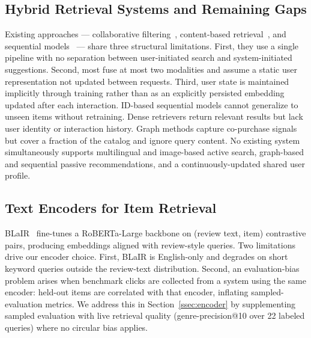 \subsection{Hybrid Retrieval Systems and Remaining Gaps}
Existing approaches — collaborative filtering~\cite{wang2019ngcf,he2020lightgcn,ying2018pinsage},
content-based retrieval~\cite{radford2021clip}, and sequential
models~\cite{kang2018self,xie2022difsr} — share three structural limitations.
First, they use a single pipeline with no separation between
user-initiated search and system-initiated suggestions.
Second, most fuse at most two modalities and assume a static user
representation not updated between requests.
Third, user state is maintained implicitly through training rather than
as an explicitly persisted embedding updated after each interaction.
ID-based sequential models cannot generalize to unseen items without
retraining. Dense retrievers return relevant results but lack user
identity or interaction history. Graph methods capture co-purchase
signals but cover a fraction of the catalog and ignore query content.
No existing system simultaneously supports multilingual and image-based
active search, graph-based and sequential passive recommendations, and
a continuously-updated shared user profile.

\subsection{Text Encoders for Item Retrieval}
BLaIR~\cite{hou2024amazon} fine-tunes a RoBERTa-Large backbone on
(review text, item) contrastive pairs, producing embeddings aligned
with review-style queries.
Two limitations drive our encoder choice.
First, BLaIR is English-only and degrades on short keyword queries
outside the review-text distribution.
Second, an evaluation-bias problem arises when benchmark clicks are
collected from a system using the same encoder: held-out items are
correlated with that encoder, inflating sampled-evaluation metrics.
We address this in Section~\ref{ssec:encoder} by supplementing
sampled evaluation with live retrieval quality (genre-precision@10
over 22 labeled queries) where no circular bias applies.
